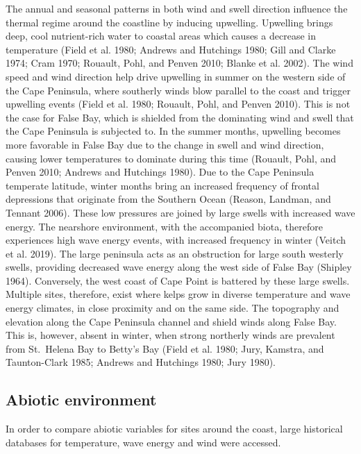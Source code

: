 \documentclass[
  a4paper,
]{article}
\begin{document}
The annual and seasonal patterns in both wind and swell direction
influence the thermal regime around the coastline by inducing upwelling.
Upwelling brings deep, cool nutrient-rich water to coastal areas which
causes a decrease in temperature (Field et al. 1980; Andrews and
Hutchings 1980; Gill and Clarke 1974; Cram 1970; Rouault, Pohl, and
Penven 2010; Blanke et al. 2002). The wind speed and wind direction help
drive upwelling in summer on the western side of the Cape Peninsula,
where southerly winds blow parallel to the coast and trigger upwelling
events (Field et al. 1980; Rouault, Pohl, and Penven 2010). This is not
the case for False Bay, which is shielded from the dominating wind and
swell that the Cape Peninsula is subjected to. In the summer months,
upwelling becomes more favorable in False Bay due to the change in swell
and wind direction, causing lower temperatures to dominate during this
time (Rouault, Pohl, and Penven 2010; Andrews and Hutchings 1980). Due
to the Cape Peninsula temperate latitude, winter months bring an
increased frequency of frontal depressions that originate from the
Southern Ocean (Reason, Landman, and Tennant 2006). These low pressures
are joined by large swells with increased wave energy. The nearshore
environment, with the accompanied biota, therefore experiences high wave
energy events, with increased frequency in winter (Veitch et al. 2019).
The large peninsula acts as an obstruction for large south westerly
swells, providing decreased wave energy along the west side of False Bay
(Shipley 1964). Conversely, the west coast of Cape Point is battered by
these large swells. Multiple sites, therefore, exist where kelps grow in
diverse temperature and wave energy climates, in close proximity and on
the same side. The topography and elevation along the Cape Peninsula
channel and shield winds along False Bay. This is, however, absent in
winter, when strong northerly winds are prevalent from St.~Helena Bay to
Betty's Bay (Field et al. 1980; Jury, Kamstra, and Taunton-Clark 1985;
Andrews and Hutchings 1980; Jury 1980).

\hypertarget{abiotic-environment}{%
\subsection{Abiotic environment}\label{abiotic-environment}}

In order to compare abiotic variables for sites around the coast, large
historical databases for temperature, wave energy and wind were
accessed.
\end{document}
